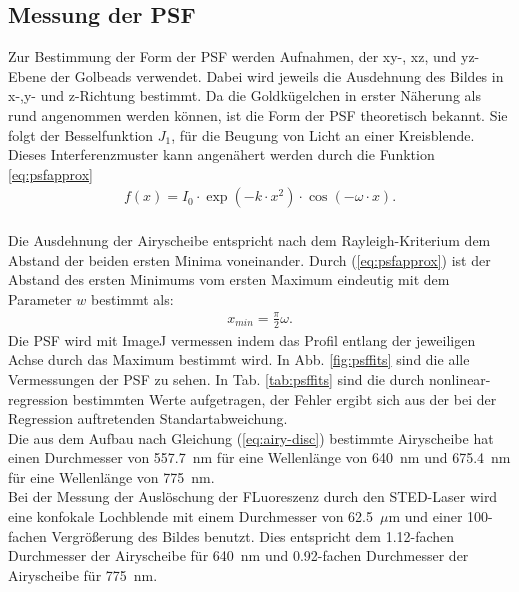 \subsection{Messung der PSF}
Zur Bestimmung der Form der PSF werden Aufnahmen, der xy-, xz, und yz-Ebene der Golbeads verwendet. 
Dabei wird jeweils die Ausdehnung des Bildes in x-,y- und z-Richtung bestimmt.
Da die Goldkügelchen in erster Näherung als rund angenommen werden können, ist die Form der PSF theoretisch bekannt.
Sie folgt der Besselfunktion $J_1$, für die Beugung von Licht an einer Kreisblende.
Dieses Interferenzmuster kann angenähert werden durch die Funktion \ref{eq:psfapprox}
\begin{align}
	f(x)=I_0 \cdot \exp \left( -k \cdot x^2 \right) \cdot \cos \left(-\omega\cdot x\right). \label{eq:psfapprox}
\end{align}
\\ 
Die Ausdehnung der Airyscheibe entspricht nach dem Rayleigh-Kriterium dem Abstand der beiden ersten Minima voneinander. 
Durch (\ref{eq:psfapprox}) ist der Abstand des ersten Minimums vom ersten Maximum eindeutig mit dem Parameter $w$ bestimmt als:
\begin{align}
x_{min} = \frac{\pi}{2}\omega.
\end{align}
Die PSF wird mit ImageJ vermessen indem das Profil entlang der jeweiligen Achse durch das Maximum bestimmt wird.
In Abb. \ref{fig:psffits} sind die alle Vermessungen der PSF zu sehen. In Tab. \ref{tab:psffits} sind die durch nonlinear-regression bestimmten Werte aufgetragen, der Fehler ergibt sich aus der bei der Regression auftretenden Standartabweichung.
\\
Die aus dem Aufbau nach Gleichung (\ref{eq:airy-disc}) bestimmte Airyscheibe hat einen Durchmesser von 557.7~nm für eine Wellenlänge von 640~nm und 675.4~nm für eine Wellenlänge von 775~nm.
\\
Bei der Messung der Auslöschung der FLuoreszenz durch den STED-Laser wird eine konfokale Lochblende mit einem Durchmesser von 62.5~$\mu$m und einer 100-fachen Vergrößerung des Bildes benutzt. 
Dies entspricht dem 1.12-fachen Durchmesser der Airyscheibe für 640~nm und 0.92-fachen Durchmesser der Airyscheibe für 775~nm.
